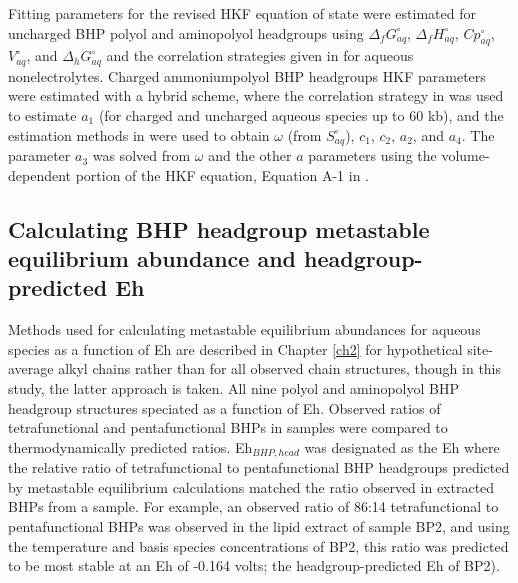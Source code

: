 Fitting parameters for the revised HKF equation of state were estimated for uncharged BHP polyol and aminopolyol headgroups using $\Delta_{f}G^{\circ}_{aq}$, $\Delta_{f}H^{\circ}_{aq}$, $Cp^{\circ}_{aq}$, $V^{\circ}_{aq}$, and $\Delta_{h}G^{\circ}_{aq}$ and the correlation strategies given in \cite{plyasunov2001correlation} for aqueous nonelectrolytes. Charged ammoniumpolyol BHP headgroups HKF parameters were estimated with a hybrid scheme, where the correlation strategy in \cite{sverjensky2014water} was used to estimate $a_{1}$ (for charged and uncharged aqueous species up to 60 kb), and the estimation methods in \cite{shock1990calculation} were used to obtain $\omega$ (from $S^{\circ}_{aq}$), $c_{1}$, $c_{2}$, $a_{2}$, and $a_{4}$. The parameter $a_{3}$ was solved from $\omega$ and the other $a$ parameters using the volume-dependent portion of the HKF equation, Equation A-1 in \cite{tanger1988calculation}.

\subsection{Calculating BHP headgroup metastable equilibrium abundance and headgroup-predicted Eh}

Methods used for calculating metastable equilibrium abundances for aqueous species as a function of Eh are described in Chapter \ref{ch2} for hypothetical site-average alkyl chains rather than for all observed chain structures, though in this study, the latter approach is taken. All nine polyol and aminopolyol BHP headgroup structures speciated as a function of Eh. Observed ratios of tetrafunctional and pentafunctional BHPs in samples were compared to thermodynamically predicted ratios. Eh$_{BHP, head}$ was designated as the Eh where the relative ratio of tetrafunctional to pentafunctional BHP headgroups predicted by metastable equilibrium calculations matched the ratio observed in extracted BHPs from a sample. For example, an observed ratio of 86:14 tetrafunctional to pentafunctional BHPs was observed in the lipid extract of sample BP2, and using the temperature and basis species concentrations of BP2, this ratio was predicted to be most stable at an Eh of -0.164 volts; the headgroup-predicted Eh of BP2).



